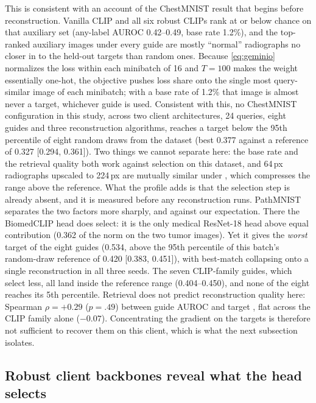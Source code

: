This is consistent with an account of the ChestMNIST result that begins before reconstruction. Vanilla CLIP and all six robust CLIPs rank \pneu at or below chance on that auxiliary set (any-label AUROC 0.42--0.49, base rate 1.2\%), and the top-ranked auxiliary images under every guide are mostly ``normal'' radiographs no closer in \lpips to the held-out targets than random ones.
Because \cref{eq:geminio} normalizes the loss within each minibatch of 16 and $T=100$ makes the weight essentially one-hot, the objective pushes loss share onto the single most query-similar image of each minibatch; with a \pneu base rate of 1.2\% that image is almost never a target, whichever guide is used.
Consistent with this, no ChestMNIST configuration in this study, across two client architectures, 24 queries, eight guides and three reconstruction algorithms, reaches a target \lpips below the 95th percentile of eight random draws from the dataset (best 0.377 against a reference of 0.327 [0.294, 0.361]).
Two things we cannot separate here: the base rate and the retrieval quality both work against selection on this dataset, and 64\,px radiographs upscaled to 224\,px are mutually similar under \lpips, which compresses the range above the reference. What the profile adds is that the selection step is already absent, and it is measured before any reconstruction runs.
PathMNIST separates the two factors more sharply, and against our expectation.
There the BiomedCLIP head does select: it is the only medical ResNet-18 head above equal contribution (0.362 of the norm on the two tumor images).
Yet it gives the \emph{worst} target \lpips of the eight guides (0.534, above the 95th percentile of this batch's random-draw reference of 0.420 [0.383, 0.451]), with best-match collapsing onto a single reconstruction in all three seeds.
The seven CLIP-family guides, which select less, all land inside the reference range (0.404--0.450), and none of the eight reaches its 5th percentile.
Retrieval does not predict reconstruction quality here: Spearman $\rho=+0.29$ ($p=.49$) between guide AUROC and target \lpips, flat across the CLIP family alone ($-0.07$).
Concentrating the gradient on the targets is therefore not sufficient to recover them on this client, which is what the next subsection isolates.

\subsection{Robust client backbones reveal what the head selects}
\label{sec:backbone}

